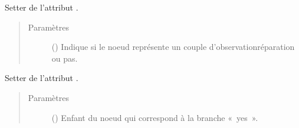 \documentclass[letterpaper,10pt,french]{sphinxmanual}
\begin{document}
\begin{fulllineitems}
\begin{fulllineitems}
\begin{quote}
\begin{description}
\end{description}\end{quote}

\end{fulllineitems}


\begin{fulllineitems}
\label{\detokenize{index:StrategyTree.Observation.set_obs_rep_couples}}
Setter de l’attribut .
\begin{quote}\begin{description}
\item[{Paramètres}] \leavevmode
{} () \textendash{} Indique si le noeud représente un couple d’observation\sphinxhyphen{}réparation
ou pas.

\end{description}\end{quote}

\end{fulllineitems}


\begin{fulllineitems}
\label{\detokenize{index:StrategyTree.Observation.set_yes_child}}
Setter de l’attribut .
\begin{quote}\begin{description}
\item[{Paramètres}] \leavevmode
{} ({\hyperref[\detokenize{index:StrategyTree.NodeST}]{}}\sphinxstyleliteralemphasis{\sphinxupquote{, }}) \textendash{} Enfant du noeud qui correspond à la branche « yes ».

\end{description}\end{quote}

\end{fulllineitems}


\end{fulllineitems}
\end{document}
